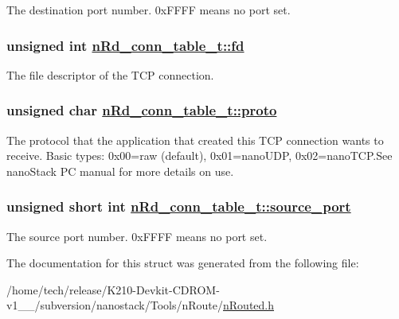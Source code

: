 The destination port number. 0x\-FFFF means no port set. \hypertarget{structnRd__conn__table__t_a5c0f98d682b0b0c72b3d4d62b086f05}{
\subsubsection[fd]{\setlength{\rightskip}{0pt plus 5cm}unsigned int \hyperlink{structnRd__conn__table__t_a5c0f98d682b0b0c72b3d4d62b086f05}{n\-Rd\_\-conn\_\-table\_\-t::fd}}}
\label{structnRd__conn__table__t_a5c0f98d682b0b0c72b3d4d62b086f05}


The file descriptor of the TCP connection. \hypertarget{structnRd__conn__table__t_6c975baed728a05b1bd47c7c13f2d50e}{
\subsubsection[proto]{\setlength{\rightskip}{0pt plus 5cm}unsigned char \hyperlink{structnRd__conn__table__t_6c975baed728a05b1bd47c7c13f2d50e}{n\-Rd\_\-conn\_\-table\_\-t::proto}}}
\label{structnRd__conn__table__t_6c975baed728a05b1bd47c7c13f2d50e}


The protocol that the application that created this TCP connection wants to receive. Basic types: 0x00=raw (default), 0x01=nano\-UDP, 0x02=nano\-TCP.See nano\-Stack PC manual for more details on use. \hypertarget{structnRd__conn__table__t_f096eab8cfea2f2bb18763a05114c3f5}{
\subsubsection[source\_\-port]{\setlength{\rightskip}{0pt plus 5cm}unsigned short int \hyperlink{structnRd__conn__table__t_f096eab8cfea2f2bb18763a05114c3f5}{n\-Rd\_\-conn\_\-table\_\-t::source\_\-port}}}
\label{structnRd__conn__table__t_f096eab8cfea2f2bb18763a05114c3f5}


The source port number. 0x\-FFFF means no port set. 

The documentation for this struct was generated from the following file:\begin{CompactItemize}
\item 
/home/tech/release/K210-Devkit-CDROM-v1\_\_/subversion/nanostack/Tools/n\-Route/\hyperlink{nRouted_8h}{n\-Routed.h}\end{CompactItemize}
